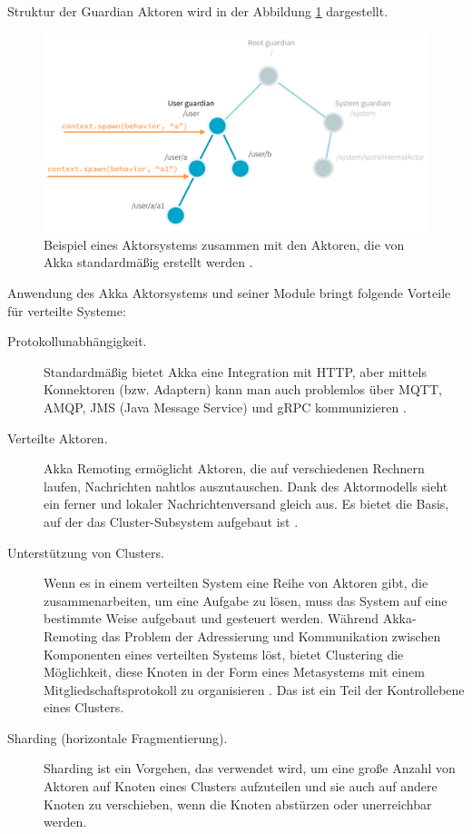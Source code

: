 Struktur der Guardian Aktoren wird in der Abbildung \ref{fig:akkaActors} dargestellt.

\begin{figure}
	\centering
	\includegraphics[width=0.7\linewidth]{images/3_akka_actors}
	\caption{Beispiel eines Aktorsystems zusammen mit den Aktoren, die von Akka standardmäßig erstellt werden \cite{akka}.}
	\label{fig:akkaActors}
\end{figure}

Anwendung des Akka Aktorsystems und seiner Module bringt folgende Vorteile für verteilte Systeme:

\begin{description} 
	\item[Protokollunabhängigkeit.] Standardmäßig bietet Akka eine Integration mit HTTP, aber mittels Konnektoren (bzw. Adaptern) kann man auch problemlos über MQTT, AMQP, JMS (Java Message Service) und gRPC kommunizieren \cite{akka}.
	
	\item[Verteilte Aktoren.] Akka Remoting ermöglicht Aktoren, die auf verschiedenen Rechnern laufen, Nachrichten nahtlos auszutauschen. Dank des Aktormodells sieht ein ferner und lokaler Nachrichtenversand gleich aus. Es bietet die Basis, auf der das Cluster-Subsystem aufgebaut ist \cite{akka}.
	
	\item[Unterstützung von Clusters.] Wenn es in einem verteilten System eine Reihe von Aktoren gibt, die zusammenarbeiten, um eine Aufgabe zu lösen, muss das System auf eine bestimmte Weise aufgebaut und gesteuert werden. Während Akka-Remoting das Problem der Adressierung und Kommunikation zwischen Komponenten eines verteilten Systems löst, bietet Clustering die Möglichkeit, diese Knoten in der Form eines Metasystems mit einem Mitgliedschaftsprotokoll zu organisieren \cite{akka}. Das ist ein Teil der Kontrollebene eines Clusters.
	
	\item[Sharding (horizontale Fragmentierung).] Sharding ist ein Vorgehen, das verwendet wird, um eine große Anzahl von Aktoren auf Knoten eines Clusters aufzuteilen und sie auch auf andere Knoten zu verschieben, wenn die Knoten abstürzen oder unerreichbar werden.
\end{description}

